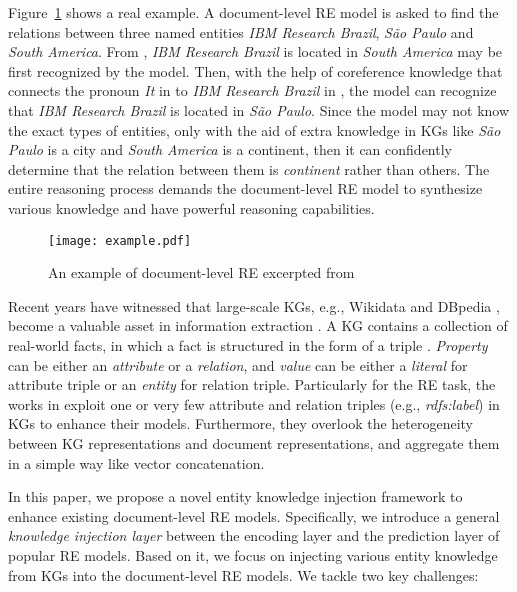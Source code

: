 \documentclass[runningheads]{llncs}
\begin{document}
Figure~\ref{fig:example} shows a real example. 
A document-level RE model is asked to find the relations between three named entities \textit{IBM Research Brazil}, \textit{S\~{a}o Paulo} and \textit{South America}. 
From , \textit{IBM Research Brazil} is located in \textit{South America} may be first recognized by the model. 
Then, with the help of coreference knowledge that connects the pronoun \textit{It} in  to \textit{IBM Research Brazil} in , the model can recognize that \textit{IBM Research Brazil} is located in \textit{S\~{a}o Paulo}. 
Since the model may not know the exact types of entities, only with the aid of extra knowledge in KGs like \textit{S\~{a}o Paulo} is a city and \textit{South America} is a continent, then it can confidently determine that the relation between them is \textit{continent} rather than others. 
The entire reasoning process demands the document-level RE model to synthesize various knowledge and have powerful reasoning capabilities. 

\begin{figure}[!tb]
	\centering
	\texttt{[image: example.pdf]}
	\caption{An example of document-level RE excerpted from \cite{yao2019docred}}
	\label{fig:example}
\end{figure}

Recent years have witnessed that large-scale KGs, e.g., Wikidata
\cite{vrandevcic2014wikidata} and DBpedia \cite{auer2007dbpedia}, become a valuable asset in information extraction \cite{bastos2021recon,fernandez2020enhancing,pan2019entity,tong2020improving,turker2020weakly,vashishth2018reside,verlinden2021injecting}. 
A KG contains a collection of real-world facts, in which a fact is structured in the form of a triple . 
\textit{Property} can be either an \textit{attribute} or a \textit{relation}, and \textit{value} can be either a \textit{literal} for attribute triple or an \textit{entity} for relation triple.
Particularly for the RE task, the works in \cite{bastos2021recon,ji2017distant,vashishth2018reside,verlinden2021injecting} exploit one or very few attribute and relation triples (e.g., \textit{rdfs:label}) in KGs to enhance their models.
Furthermore, they overlook the heterogeneity between KG representations and document representations, and aggregate them in a simple way like vector concatenation.

In this paper, we propose a novel entity knowledge injection framework to enhance existing document-level RE models.
Specifically, we introduce a general \emph{knowledge injection layer} between the encoding layer and the prediction layer of popular RE models.  
Based on it, we focus on injecting various entity knowledge from KGs into the document-level RE models. 
We tackle two key challenges:
\end{document}

